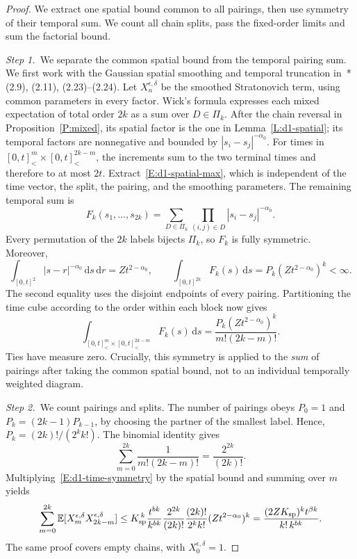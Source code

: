 \documentclass[12pt,oneside,openany]{book}
\numberwithin{equation}{section}
\theoremstyle{nogostyle}
\theoremstyle{definition}
\newcommand{\E}{\mathbb{E}}
\newcommand{\ud}{\,\mathrm{d}}
\begin{document}
\begin{proof}
  We extract one spatial bound common to all pairings, then use symmetry of
  their temporal sum. We count all chain splits, pass the fixed-order limits
  and sum the factorial bound.


  \medskip
  \noindent\textit{Step 1.~}We separate the common spatial bound from the
  temporal pairing sum.
  We first work with the Gaussian spatial smoothing and temporal truncation
  in~\cite{chen:author2026:time-dependency}*{(2.9), (2.11), (2.23)--(2.24)}. Let
  $X_n^{\epsilon,\delta}$ be the smoothed Stratonovich term, using common
  parameters in every factor. Wick's formula expresses each mixed expectation of
  total order $2k$ as a sum over $D \in \Pi_k$. After the chain reversal in
  Proposition~\ref{P:mixed}, its spatial factor is the one in
  Lemma~\ref{L:d1-spatial}; its temporal factors are nonnegative and bounded by
  $|s_i-s_j|^{-\alpha_0}$. For times in $[0,t]^m_ < \times[0,t]^{2k-m}_ <$, the
  increments sum to the two terminal times and therefore to at most $2t$.
  Extract~\eqref{E:d1-spatial-max}, which is independent of the time vector, the
  split, the pairing, and the smoothing parameters. The remaining temporal sum
  is
  \[
    F_k(s_1,\ldots,s_{2k})
    =\sum_{D\in\Pi_k}\prod_{(i,j)\in D}|s_i-s_j|^{-\alpha_0}.
  \]
  Every permutation of the $2k$ labels bijects $\Pi_k$, so $F_k$ is fully
  symmetric. Moreover,
  \[
    \int_{[0,t]^2}|s-r|^{-\alpha_0}\ud s\ud r
    =Zt^{2-\alpha_0},\qquad
    \int_{[0,t]^{2k}}F_k(s)\ud s
    =P_k(Zt^{2-\alpha_0})^k<\infty.
  \]
  The second equality uses the disjoint endpoints of every pairing. Partitioning
  the time cube according to the order within each block now gives
  \begin{equation}\label{E:d1-time-symmetry}
    \int_{[0,t]^m_<\times[0,t]^{2k-m}_<}F_k(s)\ud s
    =\frac{P_k(Zt^{2-\alpha_0})^k}{m!(2k-m)!}.
  \end{equation}
  Ties have measure zero. Crucially, this symmetry is applied to the \emph{sum}
  of pairings after taking the common spatial bound, not to an individual
  temporally weighted diagram.


  \medskip
  \noindent\textit{Step 2.~}We count pairings and splits.
  The number of pairings obeys $P_0 = 1$ and $P_k = (2k-1)P_{k-1}$, by choosing
  the partner of the smallest label. Hence, $P_k = (2k)!/(2^kk!)$. The binomial
  identity gives
  \[
    \sum_{m=0}^{2k}\frac1{m!(2k-m)!}=\frac{2^{2k}}{(2k)!}.
  \]
  Multiplying~\eqref{E:d1-time-symmetry} by the spatial bound and summing over
  $m$ yields
  \[
    \sum_{m=0}^{2k}\E[X_m^{\epsilon,\delta}X_{2k-m}^{\epsilon,\delta}]
    \le K_{\rm sp}^{\,k}\frac{t^{bk}}{k^{bk}}
    \frac{2^{2k}}{(2k)!}
    \frac{(2k)!}{2^kk!}(Zt^{2-\alpha_0})^k
    =\frac{(2ZK_{\rm sp})^kt^{\beta k}}{k!\,k^{bk}}.
  \]
  The same proof covers empty chains, with $X_0^{\epsilon,\delta} = 1$.



\end{proof}
\end{document}

